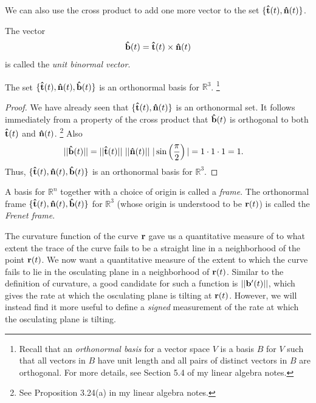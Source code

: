 \documentclass[12pt,letterpaper,reqno]{article}
\numberwithin{equation}{section}
\newcommand{\R}{\ensuremath{\mathbb R}}
\newcommand{\bb}{{\bf b}}
\newcommand{\bbr}{{\bf r}}
\newcommand{\ut}{{\bf {\hat{t}}}}
\newcommand{\un}{{\bf {\hat{n}}}}
\newcommand{\ub}{{\bf {\hat{b}}}}
\begin{document}
{We can also use the cross product to add one more vector to the set $\{\ut(t),\un(t)\}$. 
\begin{defn}
	The vector
	\begin{align*}
		\ub(t)=\ut(t) \times \un(t)
	\end{align*}
	is called the \emph{unit binormal vector}.
\end{defn}
 
\begin{prop}
The set $\{\ut(t),\un(t),\ub(t)\}$ is an orthonormal basis for $\R^3$. \footnote{Recall that an \emph{orthonormal basis} for a vector space $V$ is a basis $B$ for $V$ such that all vectors in $B$ have unit length and all pairs of distinct vectors in $B$ are orthogonal. For more details, see Section 5.4 of my linear algebra notes.}	

\begin{proof}
	We have already seen that $\{\ut(t),\un(t)\}$ is an orthonormal set. It follows immediately from a property of the cross product that $\ub(t)$ is orthogonal to both $\ut(t)$ and $\un(t)$. \footnote{See Proposition 3.24(a) in my linear algebra notes.} Also
	\begin{align*}
		||\ub(t)||&=||\ut(t)|| \ ||\un(t)|| \ |\sin\left(\frac{\pi}{2}\right)|=1 \cdot 1 \cdot 1 = 1.
	\end{align*}
	Thus, $\{\ut(t),\un(t),\ub(t)\}$ is an orthonormal basis for $\R^3$.
\end{proof}
\end{prop}

\begin{defn}
A basis for $\R^n$ together with a choice of origin is called a \emph{frame}. The orthonormal frame $\{\ut(t),\un(t),\ub(t)\}$ for $\R^3$ (whose origin is understood to be $\bbr(t)$) is called the \emph{Frenet frame}.
\end{defn}

The curvature function of the curve $\bbr$ gave us a quantitative measure of to what extent the trace of the curve fails to be a straight line in a neighborhood of the point $\bbr(t)$. We now want a quantitative measure of the extent to which the curve fails to lie in the osculating plane in a neighborhood of $\bbr(t)$. Similar to the definition of curvature, a good candidate for such a function is $||\bb'(t)||$, which gives the rate at which the osculating plane is tilting at $\bbr(t)$. However, we will instead find it more useful to define a \emph{signed} measurement of the rate at which the osculating plane is tilting.

}
\end{document}

